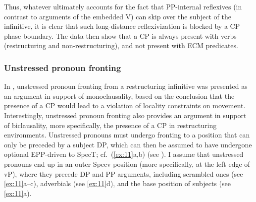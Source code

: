 \documentclass[output=paper]{langsci/langscibook}
\begin{document}
Thus, whatever ultimately accounts for the fact that PP-internal reflexives (in
contrast to arguments of the embedded V) can skip over the subject of the
infinitive, it is clear that such long-distance reflexivization is blocked by a
CP phase boundary. The data then show that a CP is always present with 
verbs (restructuring and non-restructuring), and not present with ECM
predicates.

\subsubsection{\label{b4}Unstressed pronoun fronting}\largerpage

In , unstressed pronoun fronting from a restructuring infinitive was
presented as an argument in support of monoclausality, based on the conclusion
that the presence of a CP would lead to a violation of locality constraints on
movement. Interestingly, unstressed pronoun fronting also provides an argument
in support of biclausality, more specifically, the presence of a CP in
restructuring environments.  Unstressed pronouns must undergo fronting to a
position that can only be preceded by a subject DP, which can then be assumed
to have undergone optional \gls{EPP}-driven  to SpecT; cf.\ (\ref{ex:11}a,b)
(see \citealt{Mueller:01:par,Fanselow:04:sup}).  I assume that unstressed
pronouns end up in an outer Specv position (more specifically, at the left edge
of vP), where they precede DP and PP arguments, including scrambled ones (see
\ref{ex:11}a--c), adverbials (see \ref{ex:11}d), and the base position of
subjects (see \ref{ex:11}a).

\ea\label{ex:11} 
    \z
\z
\end{document}
